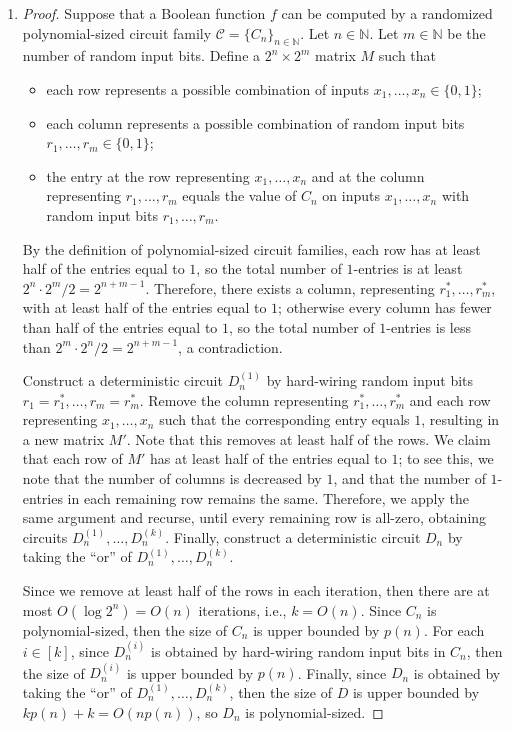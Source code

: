 \documentclass[letterpaper, reqno,11pt]{article}
\newcommand{\NN}{\mathbb{N}}
\begin{document}
\begin{enumerate}
  \item \begin{proof}
    Suppose that a Boolean function $f$ can be computed by a randomized polynomial-sized circuit family $\mathcal C = \{ C_n \}_{n \in \NN}$. Let $n \in \NN$. Let $m \in \NN$ be the number of random input bits. Define a $2^n \times 2^m$ matrix $M$ such that
    \begin{itemize}[itemsep=0pt]
      \item each row represents a possible combination of inputs $x_1, \ldots, x_n \in \{ 0, 1 \}$;
      \item each column represents a possible combination of random input bits $r_1, \ldots, r_m \in \{ 0, 1 \}$;
      \item the entry at the row representing $x_1, \ldots, x_n$ and at the column representing $r_1, \ldots, r_m$ equals the value of $C_n$ on inputs $x_1, \ldots, x_n$ with random input bits $r_1, \ldots, r_m$.
    \end{itemize}
    By the definition of polynomial-sized circuit families, each row has at least half of the entries equal to $1$, so the total number of $1$-entries is at least $2^n \cdot 2^m/2 = 2^{n + m - 1}$. Therefore, there exists a column, representing $r_1^*, \ldots, r_m^*$, with at least half of the entries equal to $1$; otherwise every column has fewer than half of the entries equal to $1$, so the total number of $1$-entries is less than $2^m \cdot 2^n/2 = 2^{n + m - 1}$, a contradiction.

    Construct a deterministic circuit $D_n^{(1)}$ by hard-wiring random input bits $r_1 = r_1^*, \ldots, r_m = r_m^*$. Remove the column representing $r_1^*, \ldots, r_m^*$ and each row representing $x_1, \ldots, x_n$ such that the corresponding entry equals $1$, resulting in a new matrix $M'$. Note that this removes at least half of the rows. We claim that each row of $M'$ has at least half of the entries equal to $1$; to see this, we note that the number of columns is decreased by $1$, and that the number of $1$-entries in each remaining row remains the same. Therefore, we apply the same argument and recurse, until every remaining row is all-zero, obtaining circuits $D_n^{(1)}, \ldots, D_n^{(k)}$. Finally, construct a deterministic circuit $D_n$ by taking the ``or'' of $D_n^{(1)}, \ldots, D_n^{(k)}$.

    Since we remove at least half of the rows in each iteration, then there are at most $O(\log 2^n) = O(n)$ iterations, i.e., $k = O(n)$. Since $C_n$ is polynomial-sized, then the size of $C_n$ is upper bounded by $p(n)$. For each $i \in [k]$, since $D_n^{(i)}$ is obtained by hard-wiring random input bits in $C_n$, then the size of $D_n^{(i)}$ is upper bounded by $p(n)$. Finally, since $D_n$ is obtained by taking the ``or'' of $D_n^{(1)}, \ldots, D_n^{(k)}$, then the size of $D$ is upper bounded by $kp(n) + k = O(np(n))$, so $D_n$ is polynomial-sized.


\end{proof}
\end{enumerate}
\end{document}

